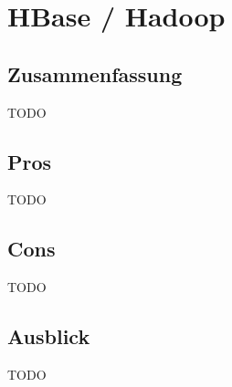 \section{HBase / Hadoop}
\subsection{Zusammenfassung}
TODO
\subsection{Pros}
TODO
\subsection{Cons}
TODO
\subsection{Ausblick}
TODO
